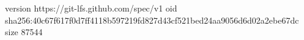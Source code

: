 version https://git-lfs.github.com/spec/v1
oid sha256:40c67f617f0d7ff4118b597219fd827d43cf521bed24aa9056d6d02a2ebe67dc
size 87544
